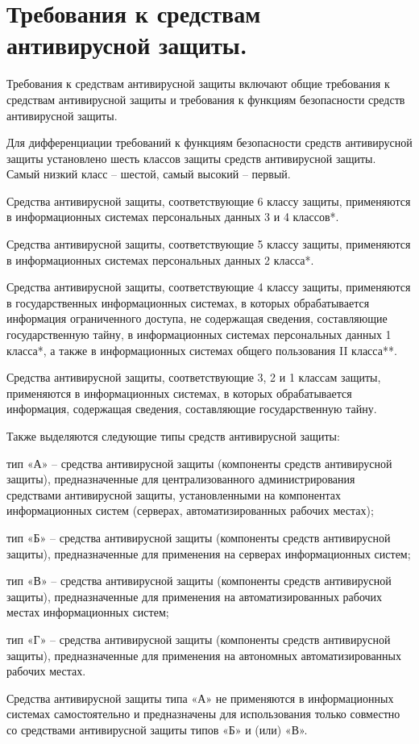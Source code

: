 \section{Требования к средствам антивирусной защиты.}

Требования к средствам антивирусной защиты включают общие требования к средствам антивирусной защиты и требования к функциям безопасности средств антивирусной защиты.

Для дифференциации требований к функциям безопасности средств антивирусной защиты установлено шесть классов защиты средств антивирусной защиты. Самый низкий класс – шестой, самый высокий – первый.

Средства антивирусной защиты, соответствующие 6 классу защиты, применяются в информационных системах персональных данных 3 и 4 классов*.

Средства антивирусной защиты, соответствующие 5 классу защиты, применяются в информационных системах персональных данных 2 класса*.

Средства антивирусной защиты, соответствующие 4 классу защиты, применяются в государственных информационных системах, в которых обрабатывается информация ограниченного доступа, не содержащая сведения, составляющие государственную тайну, в информационных системах персональных данных 1 класса*, а также в информационных системах общего пользования II класса**.

Средства антивирусной защиты, соответствующие 3, 2 и 1 классам защиты, применяются в информационных системах, в которых обрабатывается информация, содержащая сведения, составляющие государственную тайну.

Также выделяются следующие типы средств антивирусной защиты:

тип «А» – средства антивирусной защиты (компоненты средств антивирусной защиты), предназначенные для централизованного администрирования средствами антивирусной защиты, установленными на компонентах информационных систем (серверах, автоматизированных рабочих местах);

тип «Б» – средства антивирусной защиты (компоненты средств антивирусной защиты), предназначенные для применения на серверах информационных систем;

тип «В» – средства антивирусной защиты (компоненты средств антивирусной защиты), предназначенные для применения на автоматизированных рабочих местах информационных систем;

тип «Г» – средства антивирусной защиты (компоненты средств антивирусной защиты), предназначенные для применения на автономных  автоматизированных рабочих местах.

Средства антивирусной защиты типа «А» не применяются в информационных системах самостоятельно и предназначены для использования только совместно со средствами антивирусной защиты типов «Б» и (или) «В».